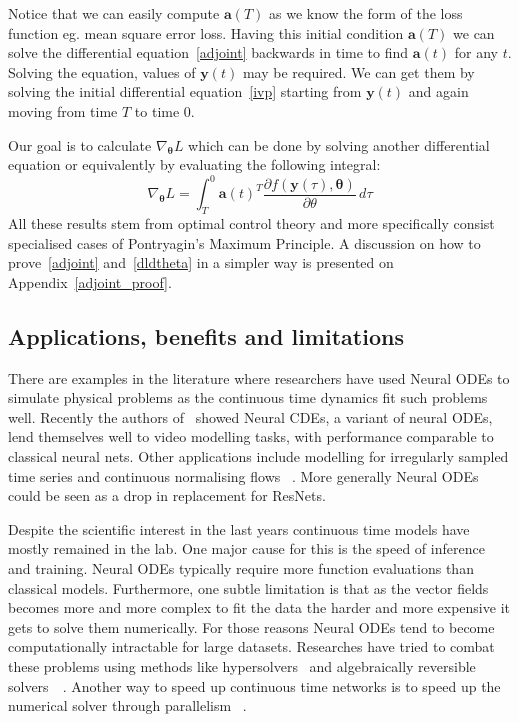 \documentclass[11pt]{report}
\begin{document}
    Notice that we can easily compute $\pmb{a}(T)$ as we know the form of the loss function eg.
    mean square error loss.
    Having this initial condition $\pmb{a}(T)$ we can solve the differential equation~\eqref{adjoint} backwards in time to find $\pmb{a}(t)$ for any $t$.
    Solving the equation, values of $\pmb{y}(t)$ may be required.
    We can get them by solving the initial differential equation~\eqref{ivp} starting from $\pmb{y}(t)$ and again moving from time $T$ to time $0$.

    Our goal is to calculate $\nabla_{\pmb{\theta}}L$ which can be done by solving another differential equation or equivalently by evaluating the following integral:
    \begin{equation}
        \nabla_{\pmb{\theta}}L
        = \int_T^0
        \pmb{a}(t)^T
        \frac
        {\partial f(\pmb{y}(\tau), \pmb{\theta})}
        {\partial \theta}
        \, d\tau
        \label{dldtheta}
    \end{equation}
    All these results stem from optimal control theory and more specifically consist specialised cases of Pontryagin's Maximum Principle.
    A discussion on how to prove~\eqref{adjoint} and~\eqref{dldtheta} in a simpler way is presented on Appendix~\ref{adjoint_proof}.

    \subsection{Applications, benefits and limitations}
    There are examples in the literature where researchers have used Neural ODEs to simulate physical problems as the continuous time dynamics fit such problems well.
    Recently the authors of~\cite{chiu2023exploiting} showed Neural CDEs, a variant of neural ODEs, lend themselves well to video modelling tasks, with performance comparable to classical neural nets.
    Other applications include modelling for irregularly sampled time series and continuous normalising flows ~\cite{chen2018neural,kidger2022neural}.
    More generally Neural ODEs could be seen as a drop in replacement for ResNets.

    Despite the scientific interest in the last years continuous time models have mostly remained in the lab.
    One major cause for this is the speed of inference and training.
    Neural ODEs typically require more function evaluations than classical models.
    Furthermore, one subtle limitation is that as the vector fields becomes more and more complex to fit the data the harder and more expensive it gets to solve them numerically.
    For those reasons Neural ODEs tend to become computationally intractable for large datasets.
    Researches have tried to combat these problems using methods like hypersolvers~\cite{poli2020hypersolvers} and algebraically
    reversible solvers~\cite{kidger2021efficient,zhuang2021mali}~.
    Another way to speed up continuous time networks is to speed up the numerical solver through parallelism ~\cite{gander201550}.
\end{document}
